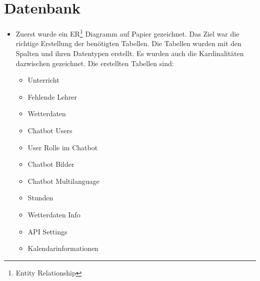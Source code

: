 \section{Datenbank}
\begin{itemize}
	\item Zuerst wurde ein ER\footnote{Entity Relationship} Diagramm auf Papier gezeichnet. Das Ziel war die richtige Erstellung der benötigten Tabellen. Die Tabellen wurden mit den Spalten und ihren Datentypen erstellt. Es wurden auch die Kardinalitäten dazwischen gezeichnet. Die erstellten Tabellen sind:
	
	\begin{itemize}
		\item Unterricht
	\end{itemize}
    \begin{itemize}
    	\item Fehlende Lehrer
    \end{itemize}
    \begin{itemize}
    	\item Wetterdaten
    \end{itemize}
    \begin{itemize}
	\item Chatbot Users
    \end{itemize}	
	\begin{itemize}
		\item User Rolle im Chatbot
	\end{itemize}
	\begin{itemize}
		\item Chatbot Bilder
	\end{itemize}
	\begin{itemize}
		\item Chatbot Multilanguage
	\end{itemize}
	\begin{itemize}
		\item Stunden
	\end{itemize}
	\begin{itemize}
		\item Wetterdaten Info
	\end{itemize}
	\begin{itemize}
		\item API Settings
	\end{itemize}
	\begin{itemize}
	\item Kalendarinformationen
	\end{itemize}
\end{itemize}
